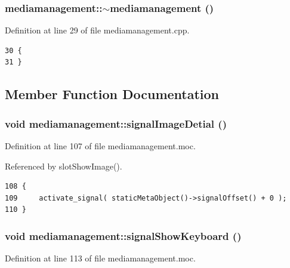 \subsubsection{\setlength{\rightskip}{0pt plus 5cm}mediamanagement::$\sim${\bf mediamanagement} ()}\label{classmediamanagement_mediamanagementa1}




Definition at line 29 of file mediamanagement.cpp.



\footnotesize\begin{verbatim}30 {
31 }
\end{verbatim}\normalsize 


\subsection{Member Function Documentation}
\subsubsection{\setlength{\rightskip}{0pt plus 5cm}void mediamanagement::signal\-Image\-Detial ()\hspace{0.3cm}{\tt  [signal]}}\label{classmediamanagement_mediamanagementl0}




Definition at line 107 of file mediamanagement.moc.

Referenced by slot\-Show\-Image().



\footnotesize\begin{verbatim}108 {
109     activate_signal( staticMetaObject()->signalOffset() + 0 );
110 }
\end{verbatim}\normalsize 
{}
\subsubsection{\setlength{\rightskip}{0pt plus 5cm}void mediamanagement::signal\-Show\-Keyboard ()\hspace{0.3cm}{\tt  [signal]}}\label{classmediamanagement_mediamanagementl1}




Definition at line 113 of file mediamanagement.moc.



